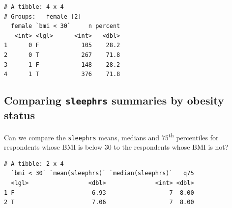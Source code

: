 \documentclass[]{book}
\newenvironment{Shaded}{\begin{snugshade}}{\end{snugshade}}
\newcommand{\KeywordTok}[1]{\textcolor[rgb]{0.13,0.29,0.53}{\textbf{#1}}}
\newcommand{\DataTypeTok}[1]{\textcolor[rgb]{0.13,0.29,0.53}{#1}}
\newcommand{\DecValTok}[1]{\textcolor[rgb]{0.00,0.00,0.81}{#1}}
\newcommand{\FloatTok}[1]{\textcolor[rgb]{0.00,0.00,0.81}{#1}}
\newcommand{\StringTok}[1]{\textcolor[rgb]{0.31,0.60,0.02}{#1}}
\newcommand{\OperatorTok}[1]{\textcolor[rgb]{0.81,0.36,0.00}{\textbf{#1}}}
\newcommand{\NormalTok}[1]{#1}
\theoremstyle{definition}
\theoremstyle{definition}
\theoremstyle{definition}
\theoremstyle{remark}
\begin{document}
\begin{Shaded}
\end{Shaded}

\begin{verbatim}
# A tibble: 4 x 4
# Groups:   female [2]
  female `bmi < 30`     n percent
   <int> <lgl>      <int>   <dbl>
1      0 F            105    28.2
2      0 T            267    71.8
3      1 F            148    28.2
4      1 T            376    71.8
\end{verbatim}

\subsection{\texorpdfstring{Comparing \texttt{sleephrs} summaries by
obesity
status}{Comparing sleephrs summaries by obesity status}}\label{comparing-sleephrs-summaries-by-obesity-status}

Can we compare the \texttt{sleephrs} means, medians and
75\textsuperscript{th} percentiles for respondents whose BMI is below 30
to the respondents whose BMI is not?

\begin{Shaded}
\end{Shaded}

\begin{verbatim}
# A tibble: 2 x 4
  `bmi < 30` `mean(sleephrs)` `median(sleephrs)`   q75
  <lgl>                 <dbl>              <int> <dbl>
1 F                      6.93                  7  8.00
2 T                      7.06                  7  8.00
\end{verbatim}
\end{document}

